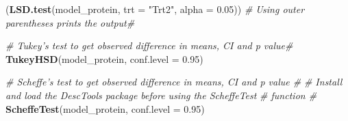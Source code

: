 \documentclass[11pt,]{article}
\newenvironment{Shaded}{\begin{snugshade}}{\end{snugshade}}
\newcommand{\CommentTok}[1]{\textcolor[rgb]{0.56,0.35,0.01}{\textit{#1}}}
\newcommand{\DataTypeTok}[1]{\textcolor[rgb]{0.13,0.29,0.53}{#1}}
\newcommand{\FloatTok}[1]{\textcolor[rgb]{0.00,0.00,0.81}{#1}}
\newcommand{\KeywordTok}[1]{\textcolor[rgb]{0.13,0.29,0.53}{\textbf{#1}}}
\newcommand{\NormalTok}[1]{#1}
\newcommand{\StringTok}[1]{\textcolor[rgb]{0.31,0.60,0.02}{#1}}
\begin{document}
\begin{Shaded}
\begin{Highlighting}[]
\NormalTok{(}\KeywordTok{LSD.test}\NormalTok{(model_protein, }\DataTypeTok{trt =} \StringTok{"Trt2"}\NormalTok{, }\DataTypeTok{alpha =} \FloatTok{0.05}\NormalTok{))  }\CommentTok{# Using outer parentheses prints the output#}

\CommentTok{# Tukey's test to get observed difference in means, CI and p value#}
\KeywordTok{TukeyHSD}\NormalTok{(model_protein, }\DataTypeTok{conf.level =} \FloatTok{0.95}\NormalTok{)}

\CommentTok{# Scheffe's test to get observed difference in means, CI and p value #}
\CommentTok{# Install and load the DescTools package before using the ScheffeTest}
\CommentTok{# function #}
\KeywordTok{ScheffeTest}\NormalTok{(model_protein, }\DataTypeTok{conf.level =} \FloatTok{0.95}\NormalTok{)}
\end{Highlighting}
\end{Shaded}




\newpage
\singlespacing 
\end{document}
